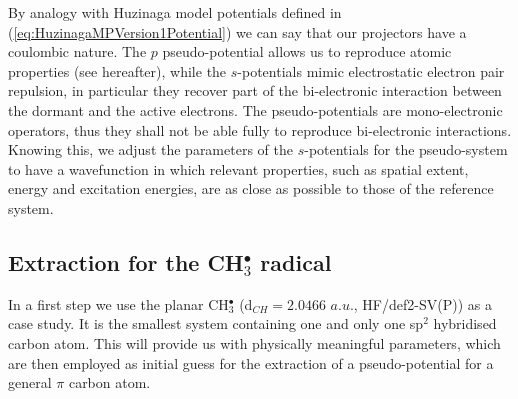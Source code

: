 \documentclass[aip]{revtex4-1}
\begin{document}
By analogy with Huzinaga model potentials defined in (\ref{eq:HuzinagaMPVersion1Potential})
we can say that our projectors have a coulombic nature.
The \(p\) pseudo-potential allows us to reproduce atomic properties (see hereafter), while the
\(s\)-potentials mimic electrostatic electron pair repulsion, in particular they 
recover part of the bi-electronic interaction
between the dormant and the active electrons. The pseudo-potentials are mono-electronic operators, thus they shall not be able fully to reproduce bi-electronic interactions. Knowing this, we adjust the parameters of the \(s\)-potentials for the pseudo-system to have a wavefunction in which relevant properties, such as spatial extent, energy and excitation energies, are as close as possible to those of the reference system.

\subsection{Extraction for the CH$_3^\bullet$ radical}
\label{section:potential_derivation}

In a first step we use the planar CH\(^{\bullet}_{3}\) (d$_{CH}=2.0466$ $a.u.$, HF/def2-SV(P)) as 
a case study.
It is the smallest system containing one and only one sp$^2$ hybridised carbon atom.
This will provide us with physically meaningful parameters, which are then employed as
initial guess for the extraction of a pseudo-potential for a general $\pi$ carbon atom.
\end{document}
